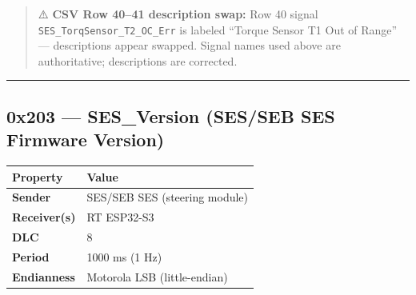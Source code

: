 \documentclass[12pt,a4paper,oneside]{report}
\begin{document}
\begin{quote}
⚠️ \textbf{CSV Row 40--41 description swap:} Row 40 signal
\texttt{SES\_TorqSensor\_T2\_OC\_Err} is labeled ``Torque Sensor T1 Out of
Range'' --- descriptions appear swapped. Signal names used above are
authoritative; descriptions are corrected.
\end{quote}

\begin{center}\rule{0.5\linewidth}{0.5pt}\end{center}

\subsection{0x203 --- SES\_Version (SES/SEB SES Firmware
Version)}\label{x203-ses_version-SES/SEB-SES-firmware-version}

\begin{longtable}[]{@{}ll@{}}
\toprule\noalign{}
Property & Value \\
\midrule\noalign{}
\endhead
\bottomrule\noalign{}
\endlastfoot
\textbf{Sender} & SES/SEB SES (steering module) \\
\textbf{Receiver(s)} & RT ESP32-S3 \\
\textbf{DLC} & 8 \\
\textbf{Period} & 1000 ms (1 Hz) \\
\textbf{Endianness} & Motorola LSB (little-endian) \\
\end{longtable}
\end{document}
